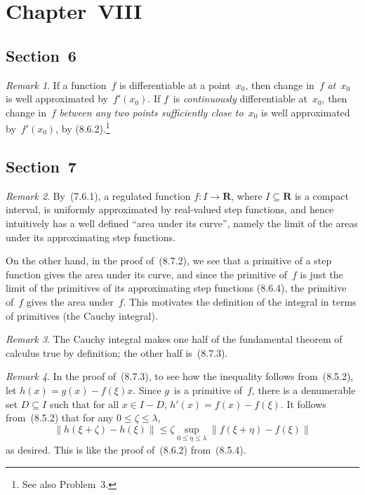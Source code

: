 \documentclass[letterpaper,12pt]{article}
\newcommand{\R}{\mathbf{R}}
\newcommand{\norm}[1]{\lVert{#1}\rVert}
\theoremstyle{plain}
\theoremstyle{definition}
\theoremstyle{remark}
\newtheorem*{rmk}{Remark}
\begin{document}
\section*{Chapter~VIII}
\subsection*{Section~6}
\begin{rmk}
If a function~\(f\) is differentiable at a point~\(x_0\), then change in~\(f\) \emph{at~\(x_0\)} is well approximated by~\(f'(x_0)\). If \(f\)~is \emph{continuously} differentiable at~\(x_0\), then change in~\(f\) \emph{between any two points sufficiently close to~\(x_0\)} is well approximated by~\(f'(x_0)\), by (8.6.2).\footnote{See also Problem~3.}
\end{rmk}

\subsection*{Section~7}
\begin{rmk}
By~(7.6.1), a regulated function \(f:I\to\R\), where \(I\subseteq\R\) is a compact interval, is uniformly approximated by real-valued step functions, and hence intuitively has a well defined ``area under its curve'', namely the limit of the areas under its approximating step functions.

On the other hand, in the proof of~(8.7.2), we see that a primitive of a step function gives the area under its curve, and since the primitive of~\(f\) is just the limit of the primitives of its approximating step functions (8.6.4), the primitive of~\(f\) gives the area under~\(f\). This motivates the definition of the integral in terms of primitives (the Cauchy integral).
\end{rmk}

\begin{rmk}
The Cauchy integral makes one half of the fundamental theorem of calculus true by definition; the other half is~(8.7.3).
\end{rmk}

\begin{rmk}
In the proof of~(8.7.3), to see how the inequality follows from~(8.5.2), let \(h(x)=g(x)-f(\xi)x\). Since \(g\)~is a primitive of~\(f\), there is a denumerable set \(D\subseteq I\) such that for all \(x\in I-D\), \(h'(x)=f(x)-f(\xi)\). It follows from~(8.5.2) that for any \(0\le\zeta\le\lambda\),
\[\norm{h(\xi+\zeta)-h(\xi)}\le\zeta\sup_{0\le\eta\le\lambda}\norm{f(\xi+\eta)-f(\xi)}\]
as desired. This is like the proof of~(8.6.2) from~(8.5.4).
\end{rmk}
\end{document}
